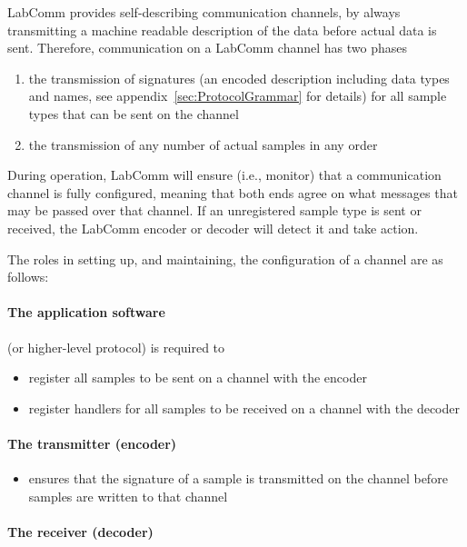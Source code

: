 \documentclass[a4paper]{article}
\begin{document}
LabComm provides self-describing communication channels, by always transmitting
a machine readable description of the data before actual data is sent.
Therefore, communication on a LabComm channel has two phases

\begin{enumerate}
\item the transmission of signatures (an encoded description including data
types and names, see appendix~\ref{sec:ProtocolGrammar} for details) for all sample types
that can be sent on the channel
\item the transmission of any number of actual samples in any order
\end{enumerate}

During operation, LabComm will ensure (i.e., monitor) that a communication
channel is fully configured, meaning that both ends agree on what messages that
may be passed over that channel.  If an unregistered sample type is sent or
received, the LabComm encoder or decoder will detect it and take action.

The roles in setting up, and maintaining, the configuration of a channel are as follows:

\paragraph{The application software} (or higher-level protocol) is required to

\begin{itemize}
\item register all samples to be sent on a channel with the encoder
\item register handlers for all samples to be received  on a channel with the decoder
\end{itemize}

\paragraph{The transmitter (encoder)}

\begin{itemize}
 \item ensures that the signature of a sample is transmitted on the channel before samples are 
       written to that channel
\end{itemize}

\paragraph{The receiver (decoder)}
\end{document}

